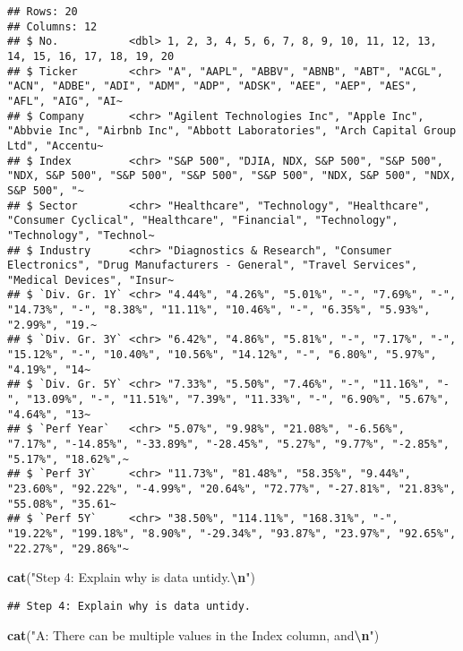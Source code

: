 \documentclass[
]{article}
\newenvironment{Shaded}{\begin{snugshade}}{\end{snugshade}}
\newcommand{\FunctionTok}[1]{\textcolor[rgb]{0.13,0.29,0.53}{\textbf{#1}}}
\newcommand{\NormalTok}[1]{#1}
\newcommand{\SpecialCharTok}[1]{\textcolor[rgb]{0.81,0.36,0.00}{\textbf{#1}}}
\newcommand{\StringTok}[1]{\textcolor[rgb]{0.31,0.60,0.02}{#1}}
\begin{document}
\begin{verbatim}
## Rows: 20
## Columns: 12
## $ No.           <dbl> 1, 2, 3, 4, 5, 6, 7, 8, 9, 10, 11, 12, 13, 14, 15, 16, 17, 18, 19, 20
## $ Ticker        <chr> "A", "AAPL", "ABBV", "ABNB", "ABT", "ACGL", "ACN", "ADBE", "ADI", "ADM", "ADP", "ADSK", "AEE", "AEP", "AES", "AFL", "AIG", "AI~
## $ Company       <chr> "Agilent Technologies Inc", "Apple Inc", "Abbvie Inc", "Airbnb Inc", "Abbott Laboratories", "Arch Capital Group Ltd", "Accentu~
## $ Index         <chr> "S&P 500", "DJIA, NDX, S&P 500", "S&P 500", "NDX, S&P 500", "S&P 500", "S&P 500", "S&P 500", "NDX, S&P 500", "NDX, S&P 500", "~
## $ Sector        <chr> "Healthcare", "Technology", "Healthcare", "Consumer Cyclical", "Healthcare", "Financial", "Technology", "Technology", "Technol~
## $ Industry      <chr> "Diagnostics & Research", "Consumer Electronics", "Drug Manufacturers - General", "Travel Services", "Medical Devices", "Insur~
## $ `Div. Gr. 1Y` <chr> "4.44%", "4.26%", "5.01%", "-", "7.69%", "-", "14.73%", "-", "8.38%", "11.11%", "10.46%", "-", "6.35%", "5.93%", "2.99%", "19.~
## $ `Div. Gr. 3Y` <chr> "6.42%", "4.86%", "5.81%", "-", "7.17%", "-", "15.12%", "-", "10.40%", "10.56%", "14.12%", "-", "6.80%", "5.97%", "4.19%", "14~
## $ `Div. Gr. 5Y` <chr> "7.33%", "5.50%", "7.46%", "-", "11.16%", "-", "13.09%", "-", "11.51%", "7.39%", "11.33%", "-", "6.90%", "5.67%", "4.64%", "13~
## $ `Perf Year`   <chr> "5.07%", "9.98%", "21.08%", "-6.56%", "7.17%", "-14.85%", "-33.89%", "-28.45%", "5.27%", "9.77%", "-2.85%", "5.17%", "18.62%",~
## $ `Perf 3Y`     <chr> "11.73%", "81.48%", "58.35%", "9.44%", "23.60%", "92.22%", "-4.99%", "20.64%", "72.77%", "-27.81%", "21.83%", "55.08%", "35.61~
## $ `Perf 5Y`     <chr> "38.50%", "114.11%", "168.31%", "-", "19.22%", "199.18%", "8.90%", "-29.34%", "93.87%", "23.97%", "92.65%", "22.27%", "29.86%"~
\end{verbatim}

\begin{Shaded}
\begin{Highlighting}[]
\FunctionTok{cat}\NormalTok{(}\StringTok{"Step 4: Explain why is data untidy.}\SpecialCharTok{\textbackslash{}n}\StringTok{"}\NormalTok{)}
\end{Highlighting}
\end{Shaded}

\begin{verbatim}
## Step 4: Explain why is data untidy.
\end{verbatim}

\begin{Shaded}
\begin{Highlighting}[]
\FunctionTok{cat}\NormalTok{(}\StringTok{"A: There can be multiple values in the \textquotesingle{}Index\textquotesingle{} column, and}\SpecialCharTok{\textbackslash{}n}\StringTok{"}\NormalTok{)}
\end{Highlighting}
\end{Shaded}
\end{document}
